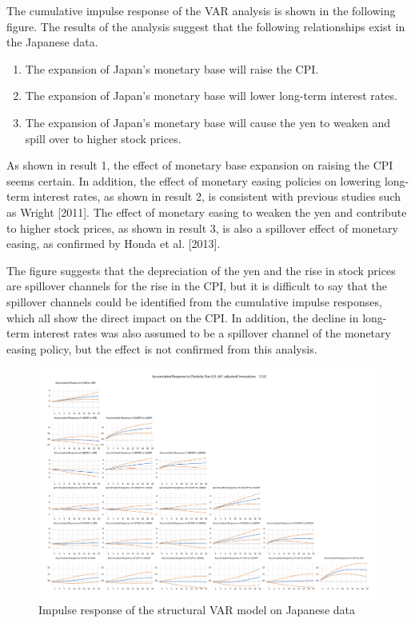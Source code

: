 \documentclass[12pt]{article}
\begin{document}
The cumulative impulse response of the VAR analysis is shown in the following figure.
The results of the analysis suggest that the following relationships exist in the Japanese data.

\begin{enumerate}
    \setlength{\leftskip}{30pt}
    \item The expansion of Japan's monetary base will raise the CPI.
    \item The expansion of Japan's monetary base will lower long-term interest rates.
    \item The expansion of Japan's monetary base will cause the yen to weaken and spill over to higher stock prices.
\end{enumerate}

As shown in result 1, the effect of monetary base expansion on raising the CPI seems certain.
In addition, the effect of monetary easing policies on lowering long-term interest rates, as shown in result 2, is consistent with previous studies such as Wright [2011].
The effect of monetary easing to weaken the yen and contribute to higher stock prices, as shown in result 3, is also a spillover effect of monetary easing, as confirmed by Honda et al. [2013].

The figure suggests that the depreciation of the yen and the rise in stock prices are spillover channels for the rise in the CPI, but it is difficult to say that the spillover channels could be identified from the cumulative impulse responses, which all show the direct impact on the CPI.
In addition, the decline in long-term interest rates was also assumed to be a spillover channel of the monetary easing policy, but the effect is not confirmed from this analysis.

\newpage
\begin{figure}[!htbp]
    \caption{Impulse response of the structural VAR model on Japanese data}
    \begin{center}
        \includegraphics[width=18cm]{jimpulse.pdf}
    \end{center}
\end{figure}
\end{document}
